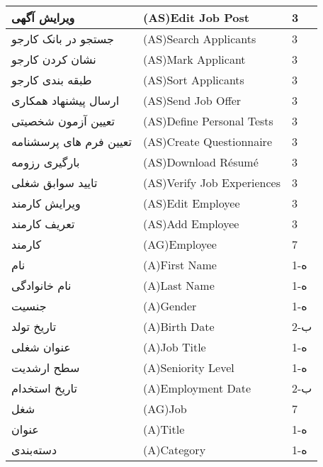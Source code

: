 \documentclass[12pt]{article}
\begin{document}
\begin{center}
\begin{table}[]
\begin{tabular}{|l|l|l|}
				ویرایش آگهی & (AS)Edit Job Post & 3     \\
				\hline
				جستجو در بانک کارجو & (AS)Search Applicants & 3     \\
				\hline
				نشان کردن کارجو & (AS)Mark Applicant & 3     \\
				\hline
				طبقه بندی کارجو & (AS)Sort Applicants & 3     \\
				\hline
				ارسال پیشنهاد همکاری & (AS)Send Job Offer & 3     \\
				\hline
				تعیین آزمون شخصیتی & (AS)Define Personal Tests & 3     \\
				\hline
				تعیین فرم های پرسشنامه & (AS)Create Questionnaire & 3     \\
				\hline
				بارگیری رزومه & (AS)Download Résumé & 3     \\
				\hline
				تایید سوابق شغلی & (AS)Verify Job Experiences & 3     \\
				\hline
				ویرایش کارمند & (AS)Edit Employee & 3     \\
				\hline
				تعریف کارمند & (AS)Add Employee & 3     \\
				\hline
				کارمند & (AG)Employee & 7     \\
				\hline
				نام & (A)First Name & 1-ه   \\
				\hline
				نام خانوادگی & (A)Last Name & 1-ه   \\
				\hline
				جنسیت & (A)Gender & 1-ه   \\
				\hline
				تاریخ تولد & (A)Birth Date & 2-ب   \\
				\hline
				عنوان شغلی & (A)Job Title & 1-ه   \\
				\hline
				سطح ارشدیت & (A)Seniority Level & 1-ه   \\
				\hline
				تاریخ استخدام & (A)Employment Date & 2-ب   \\
				\hline
				شغل & (AG)Job & 7     \\
				\hline
				عنوان & (A)Title & 1-ه   \\
				\hline
				دسته‌بندی & (A)Category & 1-ه   \\
				\hline
			\end{tabular}
		\end{table}
	\end{center}
	
\end{document}
